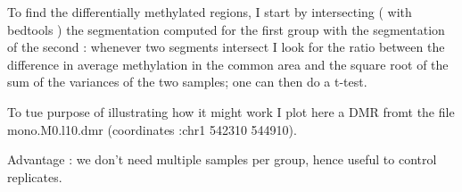 \documentclass[12pt]{amsart}
\newcommand{\gimli}{\texttt{gimli}}
\begin{document}
To find the differentially methylated regions, I start by intersecting
( with bedtools\cite{bedtools} ) the segmentation computed for the first group
with the segmentation of the second : whenever two segments intersect I look
for the ratio between the difference in average methylation in the common area 
and the square root of the sum of the variances of the two samples; one can then
do a t-test.

To tue purpose of illustrating how it might work I plot here a DMR 
fromt the file mono.M0.l10.dmr  (coordinates :chr1	542310	544910).

Advantage : we don't need multiple samples per group, hence useful to control
replicates.






\end{document}

